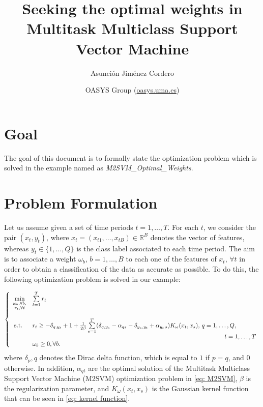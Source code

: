 \documentclass[a4paper,12pt]{article}
\begin{document}
\title{Seeking the optimal weights in Multitask Multiclass Support Vector Machine}

\author{Asunci\'on Jim\'enez Cordero}

\date{\small{OASYS Group (\url{oasys.uma.es})}}

\maketitle

\section{Goal}

The goal of this document is to formally state the optimization problem which is solved in the example named as \emph{M2SVM\_Optimal\_Weights}.

\section{Problem Formulation}

Let us assume given a set of time periods $t = 1, \ldots, T$. For each $t$, we consider the pair $(x_t, y_t)$, where $x_t = (x_{t1}, \ldots, x_{tB}) \in\mathbb{R}^B$ denotes the vector of features, whereas $y_t\in\{1, \ldots, Q\}$ is the class label associated to each time period. The aim is to associate a weight $\omega_b$, $b = 1, \ldots, B$ to each one of the features of $x_t$, $\forall t$ in order to obtain a classification of the data as accurate as possible. To do this, the following optimization problem is solved in our example:

\begin{equation}\label{eq: optimal weights problem}
  \left\{
  \begin{array}{cl}
   \min\limits_{\substack{\omega_b, \forall b,\\
   r_{t}, \forall t}} &\sum\limits_{t = 1}^T r_{t}\\
   \\
   \text{s.t. }& r_{t}\geq  - \delta_{q, y_{t}} + 1 + \frac{1}{2\beta}\sum\limits_{s = 1}^T(\delta_{q, y_{s}} - \alpha_{qs} - \delta_{y_s, y_t} + \alpha_{y_t\,s})K_{\omega}(x_t, x_s), \,q = 1, \ldots, Q, \\
   &\hspace*{11cm} t = 1, \ldots, T\\
   & \omega_b\geq 0, \forall b.
  \end{array}
    \right.
  \end{equation}
\noindent where $\delta_p,q$ denotes the Dirac delta function, which is equal to $1$ if $p = q$, and $0$ otherwise. In addition, $\alpha_{qt}$ are the optimal solution of the Multitask Multiclass Support Vector Machine (M2SVM) optimization problem in \eqref{eq: M2SVM}, $\beta$ is the regularization parameter, and $K_{\omega}(x_t, x_s)$ is the Gaussian kernel function that can be seen in \eqref{eq: kernel function}.
\end{document}
